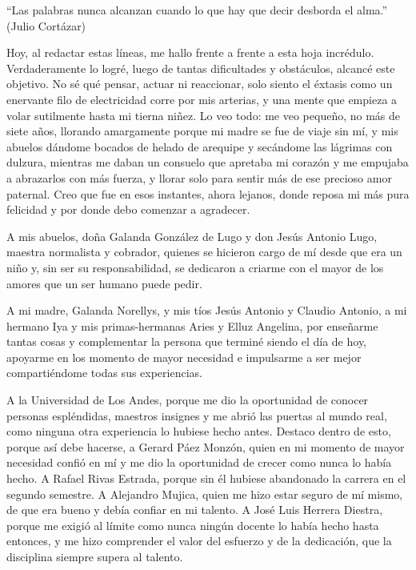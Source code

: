 \begin{displayquote}``Las palabras nunca alcanzan cuando lo que hay que decir desborda el alma.'' (Julio Cortázar)
\end{displayquote}


Hoy, al redactar estas líneas, me hallo frente a frente a esta hoja incrédulo. Verdaderamente lo logré, luego de tantas dificultades y obstáculos, alcancé este objetivo. No sé qué pensar, actuar ni reaccionar, solo siento el éxtasis como un enervante filo de electricidad corre por mis arterias, y una mente que empieza a volar sutilmente hasta mi tierna niñez. Lo veo todo: me veo pequeño, no más de siete años, llorando amargamente porque mi madre se fue de viaje sin mí, y mis abuelos dándome bocados de helado de arequipe y secándome las lágrimas con dulzura, mientras me daban un consuelo que apretaba mi corazón y me empujaba a abrazarlos con más fuerza, y llorar solo para sentir más de ese precioso amor paternal. Creo que fue en esos instantes, ahora lejanos, donde reposa mi más pura felicidad y por donde debo comenzar a agradecer.
\par
A mis abuelos, doña Galanda González de Lugo y don Jesús Antonio Lugo, maestra normalista y cobrador, quienes se hicieron cargo de mí desde que era un niño y, sin ser su responsabilidad, se dedicaron a criarme con el mayor de los amores que un ser humano puede pedir.
\par
A mi madre, Galanda Norellys, y mis tíos Jesús Antonio y Claudio Antonio, a mi hermano Iya y mis primas-hermanas Aries y Elluz Angelina, por enseñarme tantas cosas y complementar la persona que terminé siendo el día de hoy, apoyarme en los momento de mayor necesidad e impulsarme a ser mejor compartiéndome todas sus experiencias.
\par
A la Universidad de Los Andes, porque me dio la oportunidad de conocer personas espléndidas, maestros insignes y me abrió las puertas al mundo real, como ninguna otra experiencia lo hubiese hecho antes. Destaco dentro de esto, porque así debe hacerse, a Gerard Páez Monzón, quien en mi momento de mayor necesidad confió en mí y me dio la oportunidad de crecer como nunca lo había hecho. A Rafael Rivas Estrada, porque sin él hubiese abandonado la carrera en el segundo semestre. A Alejandro Mujica, quien me hizo estar seguro de mí mismo, de que era bueno y debía confiar en mi talento. A José Luis Herrera Diestra, porque me exigió al límite como nunca ningún docente lo había hecho hasta entonces, y me hizo comprender el valor del esfuerzo y de la dedicación, que la disciplina siempre supera al talento.
